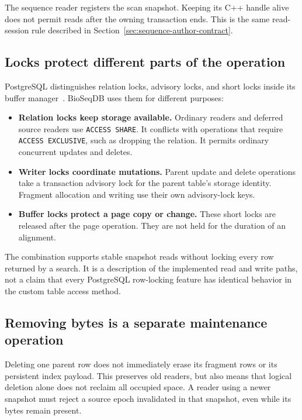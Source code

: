 The sequence reader registers the scan snapshot. Keeping its C++ handle
alive does not permit reads after the owning transaction ends. This is the
same read-session rule described in
Section~\ref{sec:sequence-author-contract}.

\subsection{Locks protect different parts of the operation}

PostgreSQL distinguishes relation locks, advisory locks, and short locks
inside its buffer manager~\autocite{postgresql17_explicit_locking}. BioSeqDB
uses them for different purposes:

\begin{itemize}
  \item \textbf{Relation locks keep storage available.} Ordinary readers
    and deferred source readers use \texttt{ACCESS SHARE}. It conflicts
    with operations that require \texttt{ACCESS EXCLUSIVE}, such as
    dropping the relation. It permits ordinary concurrent updates and
    deletes.
  \item \textbf{Writer locks coordinate mutations.} Parent update and
    delete operations take a transaction advisory lock for the parent table's
    storage identity. Fragment allocation and writing use their own
    advisory-lock keys.
  \item \textbf{Buffer locks protect a page copy or change.} These short
    locks are released after the page operation. They are not held for
    the duration of an alignment.
\end{itemize}

The combination supports stable snapshot reads without locking every row
returned by a search. It is a description of the implemented read and write
paths, not a claim that every PostgreSQL row-locking feature has identical
behavior in the custom table access method.

\subsection{Removing bytes is a separate maintenance operation}

Deleting one parent row does not immediately erase its fragment rows or its
persistent index payload. This preserves old readers, but also means that
logical deletion alone does not reclaim all occupied space. A reader using
a newer snapshot must reject a source epoch invalidated in that snapshot,
even while its bytes remain present.


